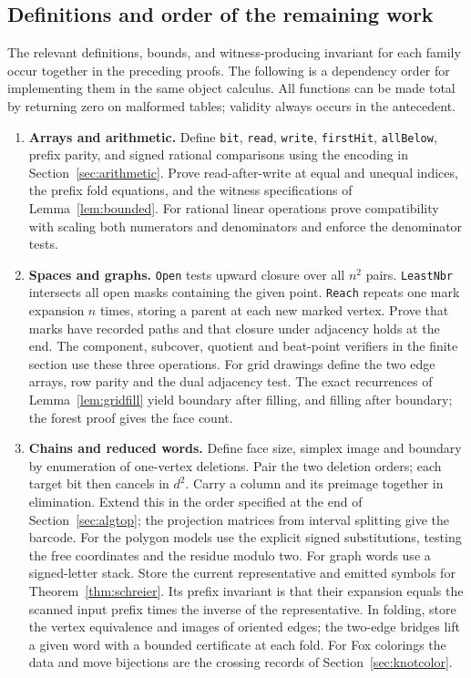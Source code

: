 \subsection{Definitions and order of the remaining work}
The relevant definitions, bounds, and witness-producing invariant for each family occur together in the preceding proofs. The following is a dependency order for implementing them in the same object calculus. All functions can be made total by returning zero on malformed tables; validity always occurs in the antecedent.
\begin{enumerate}
\item \textbf{Arrays and arithmetic.} Define \texttt{bit}, \texttt{read}, \texttt{write}, \texttt{firstHit}, \texttt{allBelow}, prefix parity, and signed rational comparisons using the encoding in Section~\ref{sec:arithmetic}. Prove read-after-write at equal and unequal indices, the prefix fold equations, and the witness specifications of Lemma~\ref{lem:bounded}. For rational linear operations prove compatibility with scaling both numerators and denominators and enforce the denominator tests.
\item \textbf{Spaces and graphs.} \texttt{Open} tests upward closure over all $n^2$ pairs. \texttt{LeastNbr} intersects all open masks containing the given point. \texttt{Reach} repeats one mark expansion $n$ times, storing a parent at each new marked vertex. Prove that marks have recorded paths and that closure under adjacency holds at the end. The component, subcover, quotient and beat-point verifiers in the finite section use these three operations. For grid drawings define the two edge arrays, row parity and the dual adjacency test. The exact recurrences of Lemma~\ref{lem:gridfill} yield boundary after filling, and filling after boundary; the forest proof gives the face count.
\item \textbf{Chains and reduced words.} Define face size, simplex image and boundary by enumeration of one-vertex deletions. Pair the two deletion orders; each target bit then cancels in $d^2$. Carry a column and its preimage together in elimination. Extend this in the order specified at the end of Section~\ref{sec:algtop}; the projection matrices from interval splitting give the barcode. For the polygon models use the explicit signed substitutions, testing the free coordinates and the residue modulo two. For graph words use a signed-letter stack. Store the current representative and emitted symbols for Theorem~\ref{thm:schreier}. Its prefix invariant is that their expansion equals the scanned input prefix times the inverse of the representative. In folding, store the vertex equivalence and images of oriented edges; the two-edge bridges lift a given word with a bounded certificate at each fold. For Fox colorings the data and move bijections are the crossing records of Section~\ref{sec:knotcolor}.

\end{enumerate}
